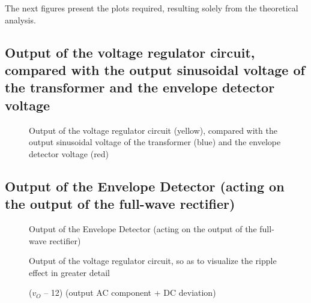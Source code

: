   The next figures present the plots required, resulting solely from the theoretical analysis.




\subsection{Output of the voltage regulator circuit, compared with the output sinusoidal voltage of the transformer and the envelope detector voltage}

\par
\begin{figure}[H] \centering
\caption{Output of the voltage regulator circuit (yellow), compared with the output sinusoidal voltage of the transformer (blue) and the envelope detector voltage (red)}
\label{fig:all_vout}
\end{figure}


\subsection{Output of the Envelope Detector (acting on the output of the full-wave rectifier)}

\par
\begin{figure}[H] \centering
\caption{Output of the Envelope Detector (acting on the output of the full-wave rectifier)}
\label{fig:envelope}
\end{figure}



\par
\begin{figure}[H] \centering
\caption{Output of the voltage regulator circuit, so as to visualize the ripple effect in greater detail}
\label{fig:regulator}
\end{figure}

\par
\begin{figure}[H] \centering
\caption{($v_O$ – 12) (output AC component + DC deviation)}
\label{fig:deviation}
\end{figure}


